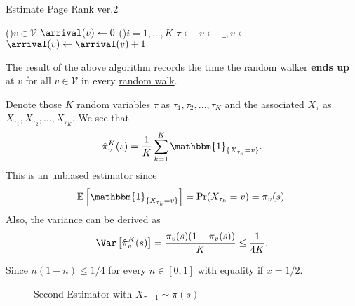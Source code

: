 \begin{algorithm}[H]\label{algo:Monte-Carlo-algorithm-2}
	\DontPrintSemicolon{}
	\caption{Estimate Page Rank ver.2}

	\BlankLine

	\For(){\(v\in \mathcal{V} \)}{
		\(\arrival(v)\gets 0\)\;
	}
	\;
	\For(){\(i = 1, \dots, K\)}{
		\(\tau \gets \) 
		\(v\gets \)
		\(\_, v\gets\)
		\(\arrival(v)\gets \arrival(v) + 1\)
	}
	\Return{\arrival}\;
\end{algorithm}
\begin{note}
	The result of \hyperref[algo:Monte-Carlo-algorithm-2]{the above algorithm} records the time the \hyperref[def:random-walker]{random walker} \textbf{ends up} at \(v\) for all \(v\in \mathcal{V} \) in every \hyperref[algo:random-walk-algorithm]{random walk}.
\end{note}

Denote those \(K\) \hyperref[def:random-variable]{random variables} \(\tau\) as \(\tau_1, \tau_2, \dots , \tau_K\) and the associated \(X_{\tau}\) as \(X_{\tau_1}, X_{\tau_2}, \dots , X_{\tau_K}\). We see that
\[
	\hat{\pi}_v^K(s) = \frac{1}{K}\sum\limits_{k=1}^{K} \mathbbm{1}_{\{X_{\tau_k} = v\}}.
\]
This is an unbiased estimator since
\[
	\mathbb{E}\left[\mathbbm{1}_{\{X_{\tau_k}=v\}}\right] = \Pr(X_{\tau_k} = v) = \pi_v(s).
\]
Also, the variance can be derived as
\[
	\Var\left[\hat{\pi}_v^K(s) \right] = \frac{\pi_v(s)(1 - \pi_v(s))}{K}\leq \frac{1}{4K}.
\]

\begin{remark}
	Since \(n(1-n)\leq 1/4\) for every \(n\in[0, 1]\) with equality if \(x = 1/2\).
\end{remark}

\begin{figure}[H]
	\centering
	\caption{Second Estimator with \(X_{\tau-1}\sim\pi(s)\)}
	\label{fig:Monte-Carlo-Estimator-2}
\end{figure}

